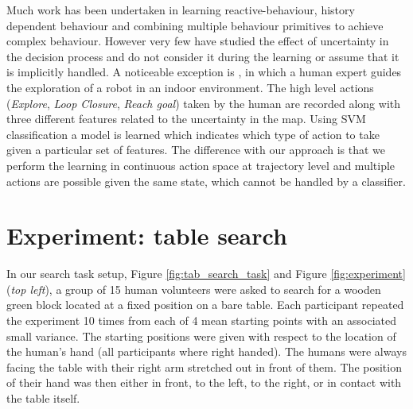 Much work has been undertaken in learning reactive-behaviour, history dependent behaviour and combining multiple behaviour primitives to achieve
complex behaviour. However very few have studied the effect of uncertainty in the decision process and 
do not consider it during the learning or assume that it is implicitly handled.
A noticeable exception is \cite{GeorgiosLidoris}, in which a human expert guides the exploration of a robot in an indoor environment. 
The high level actions (\textit{Explore}, \textit{Loop Closure}, \textit{Reach goal}) taken by the human are recorded along with three different features related to the uncertainty in the map. 
Using SVM classification a model is learned which indicates which type of action to take given a particular set of 
features. The difference with our approach is that we perform 
the learning in continuous action space at trajectory level and multiple actions are possible given the same state, which cannot be handled by a classifier.


\section{Experiment: table search}\label{ch3:experiment}

In our search task setup, Figure \ref{fig:tab_search_task} and  Figure \ref{fig:experiment} (\textit{top left}), 
a group of 15 human volunteers were asked to search for a wooden green block located at a fixed position on a bare table. 
Each participant repeated the experiment 10 times from each of 4 mean starting points with an associated small variance. 
The starting positions were given with respect to the location of the human's hand (all participants where right handed). The humans were always facing the table with their right 
arm stretched out in front of them. The  position of their hand was then either in front, to the left, to the right, or in contact with the table itself. 

